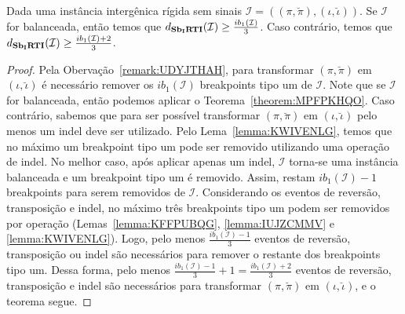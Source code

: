 \begin{theorem}\label{theorem:JDOIUJLE}
Dada uma instância intergênica rígida sem sinais $\mathcal{I}=((\pi,\breve\pi),(\iota,\breve\iota))$. Se $\mathcal{I}$ for balanceada, então temos que $d_{\textbf{Sb\textsubscript{I}RTI}}(\mathcal{I}) \ge \frac{ib_1(\mathcal{I})}{3}$. Caso contrário, temos que $d_{\textbf{Sb\textsubscript{I}RTI}}(\mathcal{I}) \ge \frac{ib_1(\mathcal{I}) + 2}{3}$.
\end{theorem}
\begin{proof}
Pela Obervação~\ref{remark:UDYJTHAH}, para transformar $(\pi,\breve\pi)$ em $(\iota,\breve\iota)$ é necessário remover os $ib_1(\mathcal{I})$ breakpoints tipo um de $\mathcal{I}$. Note que se $\mathcal{I}$ for balanceada, então podemos aplicar o Teorema~\ref{theorem:MPFPKHQO}. Caso contrário, sabemos que para ser possível transformar $(\pi,\breve\pi)$ em $(\iota,\breve\iota)$ pelo menos um indel deve ser utilizado. Pelo Lema~\ref{lemma:KWIVENLG}, temos que no máximo um breakpoint tipo um pode ser removido utilizando uma operação de indel. No melhor caso, após aplicar apenas um indel, $\mathcal{I}$  torna-se uma instância balanceada e um breakpoint tipo um é removido. Assim, restam $ib_1(\mathcal{I}) - 1$ breakpoints para serem removidos de $\mathcal{I}$. Considerando os eventos de reversão, transposição e indel, no máximo três breakpoints tipo um podem ser removidos por operação (Lemas~\ref{lemma:KFFPUBQG}, \ref{lemma:IUJZCMMV} e \ref{lemma:KWIVENLG}). Logo, pelo menos $\frac{ib_1(\mathcal{I}) - 1}{3}$ eventos de reversão, transposição ou indel são necessários para remover o restante dos breakpoints tipo um. Dessa forma, pelo menos $\frac{ib_1(\mathcal{I}) - 1}{3} + 1 = \frac{ib_1(\mathcal{I}) + 2}{3}$ eventos de reversão, transposição e indel são necessários para transformar $(\pi,\breve\pi)$ em $(\iota,\breve\iota)$, e o teorema segue.
\end{proof}

